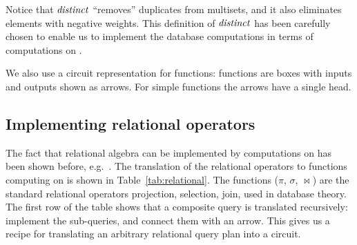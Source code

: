 Notice that $\mathit{distinct}$ ``removes'' duplicates from multisets, and it also eliminates
elements with negative weights.
This definition of $\mathit{distinct}$ has been carefully
chosen to enable us to implement the database computations
in terms of computations on \zrs.

%
%

We also use a circuit representation for functions: functions are
boxes with inputs and outputs shown as arrows.  For simple functions
the arrows have a single head.

\subsection{Implementing relational operators}\label{sec:relational-operators}

The fact that relational algebra can be implemented by computations on
\zrs has been shown before, e.g.~\cite{green-pods07}.  The translation
of the relational operators to functions computing on \zrs is shown in
Table~\ref{tab:relational}.  The functions ($\pi$, $\sigma$,
$\bowtie$) are the standard relational operators projection,
selection, join, used in database theory.  The first row of the table
shows that a composite query is translated recursively: implement the
sub-queries, and connect them with an arrow.  This gives us a recipe
for translating an arbitrary relational query plan into a circuit.

